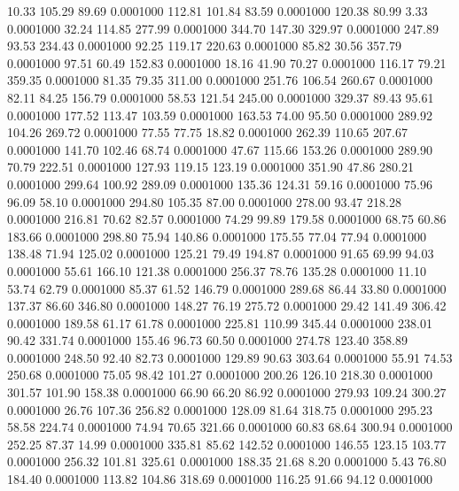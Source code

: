   10.33  105.29   89.69   0.0001000
 112.81  101.84   83.59   0.0001000
 120.38   80.99    3.33   0.0001000
  32.24  114.85  277.99   0.0001000
 344.70  147.30  329.97   0.0001000
 247.89   93.53  234.43   0.0001000
  92.25  119.17  220.63   0.0001000
  85.82   30.56  357.79   0.0001000
  97.51   60.49  152.83   0.0001000
  18.16   41.90   70.27   0.0001000
 116.17   79.21  359.35   0.0001000
  81.35   79.35  311.00   0.0001000
 251.76  106.54  260.67   0.0001000
  82.11   84.25  156.79   0.0001000
  58.53  121.54  245.00   0.0001000
 329.37   89.43   95.61   0.0001000
 177.52  113.47  103.59   0.0001000
 163.53   74.00   95.50   0.0001000
 289.92  104.26  269.72   0.0001000
  77.55   77.75   18.82   0.0001000
 262.39  110.65  207.67   0.0001000
 141.70  102.46   68.74   0.0001000
  47.67  115.66  153.26   0.0001000
 289.90   70.79  222.51   0.0001000
 127.93  119.15  123.19   0.0001000
 351.90   47.86  280.21   0.0001000
 299.64  100.92  289.09   0.0001000
 135.36  124.31   59.16   0.0001000
  75.96   96.09   58.10   0.0001000
 294.80  105.35   87.00   0.0001000
 278.00   93.47  218.28   0.0001000
 216.81   70.62   82.57   0.0001000
  74.29   99.89  179.58   0.0001000
  68.75   60.86  183.66   0.0001000
 298.80   75.94  140.86   0.0001000
 175.55   77.04   77.94   0.0001000
 138.48   71.94  125.02   0.0001000
 125.21   79.49  194.87   0.0001000
  91.65   69.99   94.03   0.0001000
  55.61  166.10  121.38   0.0001000
 256.37   78.76  135.28   0.0001000
  11.10   53.74   62.79   0.0001000
  85.37   61.52  146.79   0.0001000
 289.68   86.44   33.80   0.0001000
 137.37   86.60  346.80   0.0001000
 148.27   76.19  275.72   0.0001000
  29.42  141.49  306.42   0.0001000
 189.58   61.17   61.78   0.0001000
 225.81  110.99  345.44   0.0001000
 238.01   90.42  331.74   0.0001000
 155.46   96.73   60.50   0.0001000
 274.78  123.40  358.89   0.0001000
 248.50   92.40   82.73   0.0001000
 129.89   90.63  303.64   0.0001000
  55.91   74.53  250.68   0.0001000
  75.05   98.42  101.27   0.0001000
 200.26  126.10  218.30   0.0001000
 301.57  101.90  158.38   0.0001000
  66.90   66.20   86.92   0.0001000
 279.93  109.24  300.27   0.0001000
  26.76  107.36  256.82   0.0001000
 128.09   81.64  318.75   0.0001000
 295.23   58.58  224.74   0.0001000
  74.94   70.65  321.66   0.0001000
  60.83   68.64  300.94   0.0001000
 252.25   87.37   14.99   0.0001000
 335.81   85.62  142.52   0.0001000
 146.55  123.15  103.77   0.0001000
 256.32  101.81  325.61   0.0001000
 188.35   21.68    8.20   0.0001000
   5.43   76.80  184.40   0.0001000
 113.82  104.86  318.69   0.0001000
 116.25   91.66   94.12   0.0001000
